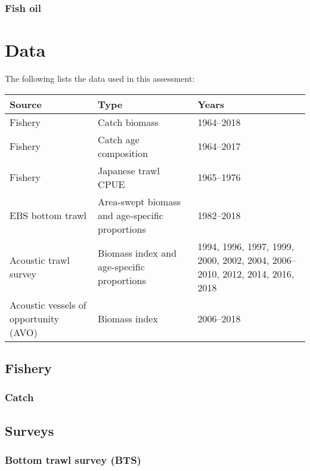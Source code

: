 \documentclass[11pt,]{article}
\begin{document}
\hypertarget{fish-oil}{%
\subsubsection{Fish oil}\label{fish-oil}}

\hypertarget{data}{%
\section{Data}\label{data}}

The following lists the data used in this assessment:

\begin{table}[ht]
\centering
\label{tab:dataextent}
\begin{tabular}{p{1.5in}p{1.8in}p{2.8in}}
\hline
 Source & Type & Years \\
\hline
 Fishery & Catch biomass & 1964--2018 \\
 Fishery & Catch age composition & 1964--2017 \\
 Fishery & Japanese trawl CPUE & 1965--1976 \\
 EBS bottom trawl & Area-swept biomass and age-specific proportions & 1982--2018 \\
 Acoustic trawl survey & Biomass index and age-specific proportions & 1994, 1996, 1997, 1999, 2000, 2002, 2004, 2006--2010, 2012, 2014, 2016, 2018 \\
 Acoustic vessels of opportunity (AVO) & Biomass index & 2006--2018 \\
\hline
\end{tabular}
\end{table}

\hypertarget{fishery-1}{%
\subsection{Fishery}\label{fishery-1}}

\hypertarget{catch}{%
\subsubsection{Catch}\label{catch}}

\hypertarget{surveys}{%
\subsection{Surveys}\label{surveys}}

\hypertarget{bottom-trawl-survey-bts}{%
\subsubsection{Bottom trawl survey
(BTS)}\label{bottom-trawl-survey-bts}}
\end{document}
